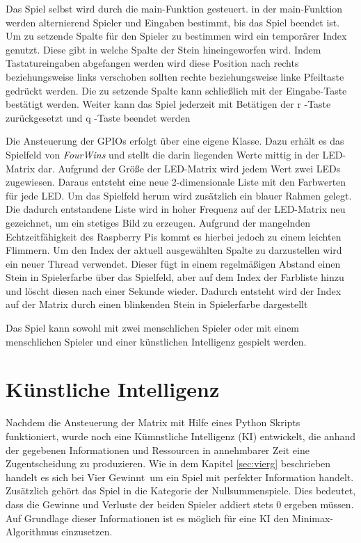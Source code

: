 Das Spiel selbst wird durch die main-Funktion gesteuert. in der main-Funktion werden alternierend Spieler und Eingaben bestimmt, bis das Spiel beendet ist. Um zu setzende Spalte für den Spieler zu bestimmen wird ein temporärer Index genutzt. Diese gibt in welche Spalte der Stein hineingeworfen wird. Indem Tastatureingaben abgefangen werden wird diese Position nach rechts beziehungsweise links verschoben sollten rechte beziehungsweise linke Pfeiltaste gedrückt werden. Die zu setzende Spalte kann schließlich mit der Eingabe-Taste bestätigt werden. Weiter kann das Spiel jederzeit mit Betätigen der \glqq r \grqq -Taste zurückgesetzt und \glqq q \grqq -Taste beendet werden

Die Ansteuerung der GPIOs erfolgt über eine eigene Klasse. Dazu erhält es das Spielfeld von
\textit{FourWins} und stellt die darin liegenden Werte mittig in der LED-Matrix dar. Aufgrund der Größe der LED-Matrix wird jedem Wert zwei LEDs zugewiesen. Daraus entsteht eine neue 2-dimensionale Liste mit den Farbwerten für jede LED. Um das Spielfeld herum wird zusätzlich ein blauer Rahmen gelegt. Die dadurch entstandene Liste wird in hoher Frequenz auf der LED-Matrix neu gezeichnet, um ein stetiges Bild zu erzeugen. Aufgrund der mangelnden Echtzeitfähigkeit des Raspberry Pis kommt es hierbei jedoch zu einem leichten Flimmern. Um den Index der aktuell ausgewählten Spalte zu darzustellen wird ein neuer Thread verwendet. Dieser fügt in einem regelmäßigen Abstand einen Stein in Spielerfarbe über das Spielfeld, aber auf dem Index der Farbliste hinzu und löscht diesen nach einer Sekunde wieder. Dadurch entsteht wird der Index auf der Matrix durch einen blinkenden Stein in Spielerfarbe dargestellt

Das Spiel kann sowohl mit zwei menschlichen Spieler oder mit einem menschlichen Spieler und einer künstlichen Intelligenz gespielt werden.

\section{Künstliche Intelligenz}
Nachdem die Ansteuerung der Matrix mit Hilfe eines Python Skripts funktioniert, wurde noch eine Kümnstliche Intelligenz (KI) entwickelt, die anhand der gegebenen Informationen und Ressourcen in annehmbarer Zeit eine Zugentscheidung zu produzieren.
Wie in dem Kapitel \ref{sec:vierg} beschrieben handelt es sich bei \glqq Vier Gewinnt\grqq ~um ein Spiel mit perfekter Information handelt. Zusätzlich gehört das Spiel in die Kategorie der Nullsummenspiele. Dies bedeutet, dass die Gewinne und Verluste der beiden Spieler addiert stets 0 ergeben müssen.
Auf Grundlage dieser Informationen ist es möglich für eine KI den Minimax-Algorithmus einzusetzen.

